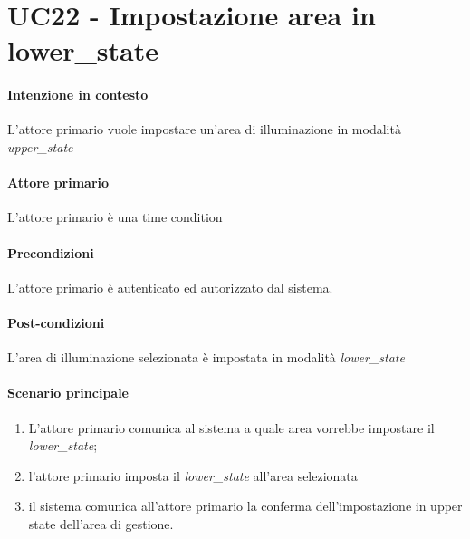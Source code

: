 \section{UC22 - Impostazione area in lower\_state}\label{uc:22}
\paragraph{Intenzione in contesto} L'attore primario vuole impostare un'area di illuminazione in modalità \textit{upper\_state}
\paragraph{Attore primario} L'attore primario è una time condition %
\paragraph{Precondizioni} L'attore primario è autenticato ed autorizzato dal sistema.
\paragraph{Post-condizioni} L'area di illuminazione selezionata è impostata in modalità \textit{lower\_state}
\paragraph{Scenario principale}
\begin{enumerate}
    \item L'attore primario comunica al sistema a quale area vorrebbe impostare il \textit{lower\_state};
    \item l'attore primario imposta il \textit{lower\_state} all'area selezionata
    \item il sistema comunica all'attore primario la conferma dell'impostazione in upper state dell'area di gestione.
\end{enumerate}